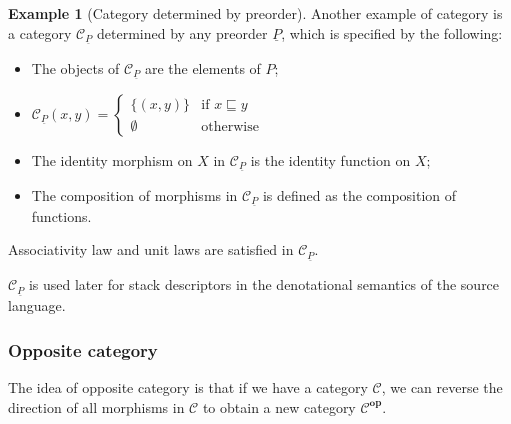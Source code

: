 \documentclass[12pt,a4paper]{report}
\theoremstyle{definition}
\newtheorem{example}[definition]{Example}
\begin{document}
        \begin{example}[Category determined by preorder] \label{ex: category_preorder}
            Another example of category is a category $\mathcal{C}_{\underline{P}}$ determined by any preorder $\underline{P}$, which is specified by the following:
            \begin{itemize}
                \item 
                    The objects of $\mathcal{C}_{\underline{P}}$ are the elements of $P$;
                \item
                    $\mathcal{C}_{\underline{P}}(x,y) = \begin{cases}
                        \{(x,y)\} & \text{if $x \sqsubseteq y$} \\
                        \emptyset & \text{otherwise}
                    \end{cases}$
                \item
                    The identity morphism on $X$ in $\mathcal{C}_{\underline{P}}$ is the identity function on $X$;
                \item
                    The composition of morphisms in $\mathcal{C}_{\underline{P}}$ is defined as the composition of functions.
            \end{itemize}
            Associativity law and unit laws are satisfied in $\mathcal{C}_{\underline{P}}$.

            $\mathcal{C}_{\underline{P}}$ is used later for stack descriptors in the denotational semantics of the source language.
        \end{example}

            \subsubsection{Opposite category}
            The idea of opposite category is that if we have a category $\mathcal{C}$, we can reverse the direction of all morphisms in $\mathcal{C}$ to obtain a new category $\mathcal{C}^{\textbf{op}}$.
\end{document}
